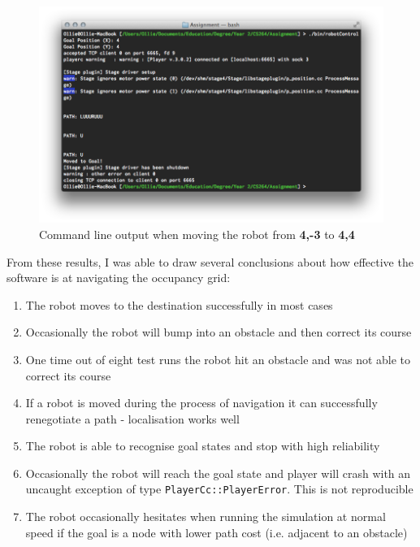 \documentclass[a4paper,12pt]{article}
\begin{document}
\newpage
    \begin{figure}
        \begin{center}
            \includegraphics[scale=0.6]{images/Testing_CLI.png}
            \caption{Command line output when moving the robot from \textbf{4,-3} to \textbf{4,4}}
        \end{center}
\end{figure}

From these results, I was able to draw several conclusions about how effective the software is at navigating the occupancy grid:

\begin{enumerate}
    \item{The robot moves to the destination successfully in most cases}
    \item{Occasionally the robot will bump into an obstacle and then correct its course}
    \item{One time out of eight test runs the robot hit an obstacle and was not able to correct its course}
    \item{If a robot is moved during the process of navigation it can successfully renegotiate a path - localisation works well}
    \item{The robot is able to recognise goal states and stop with high reliability}
    \item{Occasionally the robot will reach the goal state and player will crash with an uncaught exception of type \texttt{PlayerCc::PlayerError}. This is not reproducible}
    \item{The robot occasionally hesitates when running the simulation at normal speed if the goal is a node with lower path cost (i.e. adjacent to an obstacle)}
\end{enumerate}
\end{document}
